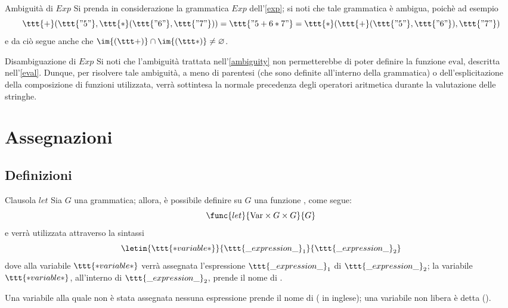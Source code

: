 \documentclass[a4paper, 12pt]{report}
\begin{document}
    \begin{framedobs}[label={ambiguity}]{Ambiguità di $Exp$}
        Si prenda in considerazione la grammatica $Exp$ dell'\cref{exp}; si noti che tale grammatica è ambigua, poichè ad esempio $$\ttt{+}(\ttt{"5"}, \ttt{*}(\ttt{"6"}, \ttt{"7"})) = \ttt{"5 + 6 * 7"} = \ttt{*}(\ttt{+}(\ttt{"5"}, \ttt{"6"}), \ttt{"7"})$$ e da ciò segue anche che $\im{(\ttt+)} \cap \im{(\ttt *)} \neq \varnothing$.
    \end{framedobs}

    \begin{framedobs}{Disambiguazione di $Exp$}
        Si noti che l'ambiguità trattata nell'\cref{ambiguity} non permetterebbe di poter definire la funzione $\mathrm{eval}$, descritta nell'\cref{eval}. Dunque, per risolvere tale ambiguità, a meno di parentesi (che  sono definite all'interno della grammatica) o dell'esplicitazione della composizione di funzioni utilizzata, verrà sottintesa la normale precedenza degli operatori aritmetica durante la valutazione delle stringhe.
    \end{framedobs}

    \section{Assegnazioni}

    \subsection{Definizioni}

    \begin{frameddefn}[label={let}]{Clausola $let$}
        Sia $G$ una grammatica; allora, è possibile definire su $G$ una funzione , come segue: $$\func{let}{\mathrm{Var} \times G \times G}{G}$$ e verrà utilizzata attraverso la sintassi $$\letin{\ttt{*variable*}}{\ttt{\_expression\_}_1}{\ttt{\_expression\_}_2}$$ dove alla variabile $\ttt{*variable*}$ verrà assegnata l'espressione $\ttt{\_expression\_}_1$  di $\ttt{\_expression\_}_2$; la variabile $\ttt{*variable*}$, all'interno di $\ttt{\_expression\_}_2$, prende il nome di .

        Una variabile alla quale non è stata assegnata nessuna espressione prende il nome di  ( in inglese); una variabile non libera è detta  ().
    \end{frameddefn}
    
\end{document}
